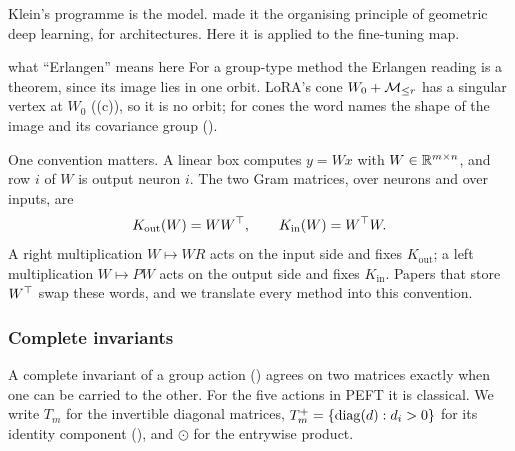 Klein's programme is the model. \citet{bronstein2021geometric} made it the organising principle of geometric deep
learning, for architectures. Here it is applied to the fine-tuning map.

\begin{analogy*}{what ``Erlangen'' means here}
For a group-type method the Erlangen reading is a theorem, since its image lies in one orbit. LoRA's cone $W_0+\mathcal{M}_{\le r}$ has a
singular vertex at $W_0$ ((c)), so it is no orbit; for cones the word names the shape of the image
and its covariance group ().
\end{analogy*}

One convention matters. A linear box computes $y=Wx$ with $W\in\mathbb{R}^{m\times n}$, and row $i$ of $W$ is output neuron $i$.
The two Gram matrices, over neurons and over inputs, are
\begin{equation*}
  K_{\mathrm{out}}(W)=WW^{\top},\qquad K_{\mathrm{in}}(W)=W^{\top} W.
\end{equation*}
A right multiplication $W\mapsto WR$ acts on the input side and fixes $K_{\mathrm{out}}$; a left multiplication
$W\mapsto PW$ acts on the output side and fixes $K_{\mathrm{in}}$. Papers that store $W^{\top}$ swap these words, and we
translate every method into this convention.

\subsubsection{Complete invariants}\label{sec:erlangen-invariants}

A complete invariant of a group action () agrees on two matrices exactly when one can be carried to the
other. For the five actions in PEFT it is classical. We write $T_m$ for the invertible diagonal matrices,
$T_m^+=\{\operatorname{diag}(d):d_i>0\}$ for its identity component (), and $\odot$ for the entrywise product.

